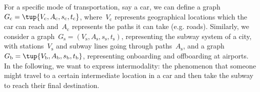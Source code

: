 For a specific mode of transportation, say a car, we can define a graph~$G_\mathrm{c}=\tup{V_\mathrm{c},A_\mathrm{c},s_\mathrm{c},t_\mathrm{c}}$, where~$V_\mathrm{c}$ represents geographical locations which the car can reach and~$A_\mathrm{c}$ represents the paths it can take (e.g. roads). Similarly, we consider a graph~$G_\mathrm{s}=(V_\mathrm{s},A_\mathrm{s},s_\mathrm{s},t_\mathrm{s})$, representing the subway system of a city, with stations~$V_\mathrm{s}$ and subway lines going through paths~$A_\mathrm{s}$, and a graph $G_\mathrm{b}=\tup{V_\mathrm{b},A_\mathrm{b},s_\mathrm{b},t_\mathrm{b}}$, representing onboarding and offboarding at airports. In the following, we want to express intermodality: the phenomenon that someone might travel to a certain intermediate location in a car and then take the subway to reach their final destination.

